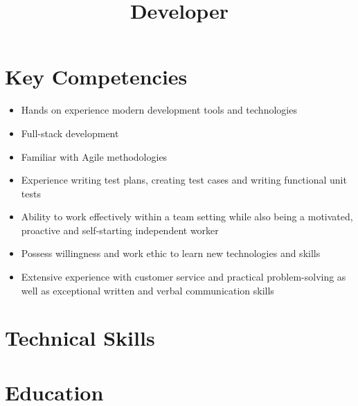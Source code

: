 \documentclass[11pt,a4paper,sans]{moderncv}        %
\title{Developer}                               %
\begin{document}
\makecvtitle
\section{Key Competencies}
\begin{itemize}%
	\item Hands on experience modern development tools and technologies 
	\item Full-stack development
	\item Familiar with Agile methodologies
	\item Experience writing test plans, creating test cases and writing functional unit tests
	\item Ability to work effectively within a team setting	while also being a motivated, proactive and self-starting independent worker
	\item Possess willingness and work ethic to learn new technologies and skills
	\item Extensive experience with customer service and practical problem-solving as well as exceptional written and verbal communication skills
\end{itemize}

\section{Technical Skills}

\section{Education}
\end{document}

